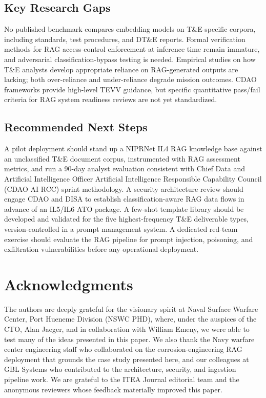\documentclass[12pt,letterpaper]{article}
\begin{document}
\subsection{Key Research Gaps}

No published benchmark compares embedding models on T\&E-specific corpora, including standards, test procedures, and DT\&E reports. Formal verification methods for RAG access-control enforcement at inference time remain immature, and adversarial classification-bypass testing is needed. Empirical studies on how T\&E analysts develop appropriate reliance on RAG-generated outputs are lacking; both over-reliance and under-reliance degrade mission outcomes. CDAO frameworks provide high-level TEVV guidance, but specific quantitative pass/fail criteria for RAG system readiness reviews are not yet standardized.

\subsection{Recommended Next Steps}

A pilot deployment should stand up a NIPRNet IL4 RAG knowledge base against an unclassified T\&E document corpus, instrumented with RAG assessment metrics, and run a 90-day analyst evaluation consistent with Chief Data and Artificial Intelligence Officer Artificial Intelligence Responsible Capability Council (CDAO AI RCC) sprint methodology. A security architecture review should engage CDAO and DISA to establish classification-aware RAG data flows in advance of an IL5/IL6 ATO package. A few-shot template library should be developed and validated for the five highest-frequency T\&E deliverable types, version-controlled in a prompt management system. A dedicated red-team exercise should evaluate the RAG pipeline for prompt injection, poisoning, and exfiltration vulnerabilities before any operational deployment.

\section*{Acknowledgments}

The authors are deeply grateful for the visionary spirit at Naval Surface Warfare Center, Port Hueneme Division (NSWC PHD), where, under the auspices of the CTO, Alan Jaeger, and in collaboration with William Emeny, we were able to test many of the ideas presented in this paper. We also thank the Navy warfare center engineering staff who collaborated on the corrosion-engineering RAG deployment that grounds the case study presented here, and our colleagues at GBL Systems who contributed to the architecture, security, and ingestion pipeline work. We are grateful to the ITEA Journal editorial team and the anonymous reviewers whose feedback materially improved this paper.

\newpage
\printbibliography
\end{document}
